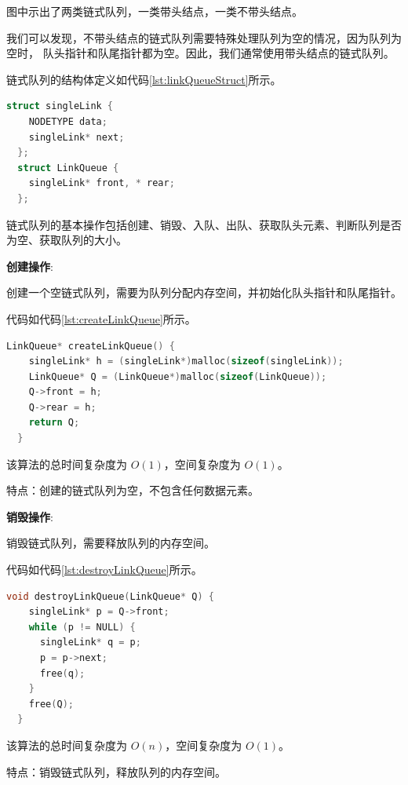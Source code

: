 \documentclass[lang=cn,newtx,10pt,scheme=chinese]{../elegantbook}
\begin{document}
图中示出了两类链式队列，一类带头结点，一类不带头结点。

我们可以发现，不带头结点的链式队列需要特殊处理队列为空的情况，因为队列为空时，
队头指针和队尾指针都为空。因此，我们通常使用带头结点的链式队列。

链式队列的结构体定义如代码\ref{lst:linkQueueStruct}所示。

\begin{lstlisting}[language=C++, caption={链式队列结构体定义}, label={lst:linkQueueStruct}]
  struct singleLink {
	NODETYPE data;
	singleLink* next;
  }; 
  struct LinkQueue {
    singleLink* front, * rear;
  };
\end{lstlisting}

链式队列的基本操作包括创建、销毁、入队、出队、获取队头元素、判断队列是否为空、获取队列的大小。

\textbf{创建操作}:

创建一个空链式队列，需要为队列分配内存空间，并初始化队头指针和队尾指针。

代码如代码\ref{lst:createLinkQueue}所示。

\begin{lstlisting}[language=C++, caption={创建一个空链式队列示例代码}, label={lst:createLinkQueue}]
  LinkQueue* createLinkQueue() {
    singleLink* h = (singleLink*)malloc(sizeof(singleLink));
    LinkQueue* Q = (LinkQueue*)malloc(sizeof(LinkQueue));
    Q->front = h;
    Q->rear = h;
    return Q;
  }
  \end{lstlisting}

该算法的总时间复杂度为 $O(1)$，空间复杂度为 $O(1)$。

特点：创建的链式队列为空，不包含任何数据元素。

\textbf{销毁操作}:

销毁链式队列，需要释放队列的内存空间。

代码如代码\ref{lst:destroyLinkQueue}所示。

\begin{lstlisting}[language=C++, caption={销毁链式队列示例代码}, label={lst:destroyLinkQueue}]
  void destroyLinkQueue(LinkQueue* Q) {
    singleLink* p = Q->front;
    while (p != NULL) {
      singleLink* q = p;
      p = p->next;
      free(q);
    }
    free(Q);
  }

\end{lstlisting}

该算法的总时间复杂度为 $O(n)$，空间复杂度为 $O(1)$。

特点：销毁链式队列，释放队列的内存空间。
\end{document}
